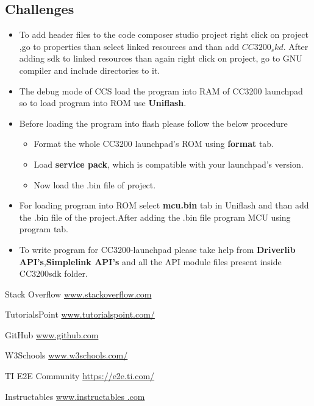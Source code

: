 \documentclass[a4paper,12pt,oneside]{book}
\begin{document}
\subsection*{Challenges}
\begin{itemize}
	\item To add header files to the code composer studio project right click on project ,go to properties than select linked resources and than add $CC3200_skd$. After adding sdk to linked resources than again right click on project, go to GNU compiler and include directories to it.
	\item The debug mode of CCS load the program into RAM of CC3200 launchpad so to load program into ROM use \textbf{Uniflash}.
	\item Before loading the program into flash please follow the below procedure
	\begin{itemize}
		\item Format the whole CC3200 launchpad's ROM using \textbf{format} tab.
		\item Load \textbf{service pack}, which is compatible with your launchpad's version.
		\item Now load the .bin file of project. 
	\end{itemize} 
	\item For loading program into ROM select \textbf{mcu.bin} tab in Uniflash and than add the .bin file of the project.After adding the .bin file program MCU using program tab.
	\item To write program for CC3200-launchpad please take help from \textbf{Driverlib API's},\textbf{Simplelink API's} and all the API module files present inside CC3200sdk folder.
	   
\end{itemize}

\begin{thebibliography}{li}
		\item{Stack Overflow  \href{www.stackoverflow.com}{www.stackoverflow.com}}
		\item{TutorialsPoint  \href{tutorialspoint.com/}{www.tutorialspoint.com/}}
		\item{GitHub  \href{github.com}{www.github.com}}
		\item{W3Schools  \href{http://www.w3schools.com/}{www.w3schools.com/}}
		\item{TI E2E Community \href{TI E2E Community}{	https://e2e.ti.com/}}
		\item{Instructables \href{www.Instructables .com}{www.instructables .com}}
	
\end{thebibliography}
\end{document}
